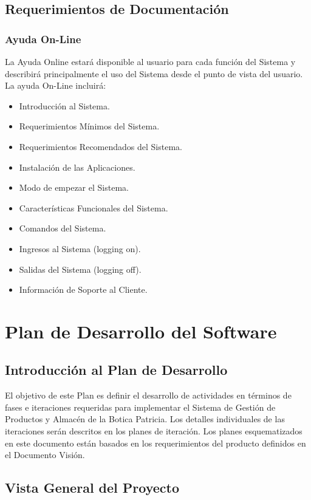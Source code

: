 \documentclass[a4paper,11pt, spanish]{report}
\begin{document}
{{{{{{{{        \subsection{Requerimientos de Documentación}
            \subsubsection {Ayuda On-Line}
                La Ayuda Online estará disponible al usuario para cada función del Sistema y describirá principalmente el uso del Sistema desde el punto de vista del usuario. La ayuda On-Line incluirá:
                \begin{itemize}
                \item Introducción al Sistema.
                \item Requerimientos Mínimos del Sistema.
                \item Requerimientos Recomendados del Sistema.
                \item Instalación de las Aplicaciones.
                \item Modo de empezar el Sistema.
                \item Características Funcionales del Sistema.
                \item Comandos del Sistema.
                \item Ingresos al Sistema (logging on).
                \item Salidas del Sistema (logging off).
                \item Información de Soporte al Cliente.
                \end{itemize}
    \section{Plan de Desarrollo del Software}
    \subsection{Introducción al Plan de Desarrollo}
        El objetivo de este Plan es definir el desarrollo de actividades en términos de fases e iteraciones requeridas para implementar el Sistema de Gestión de Productos y Almacén de la Botica Patricia. Los detalles individuales de las iteraciones serán descritos en los planes de iteración. Los planes esquematizados en este documento están basados en los requerimientos del producto definidos en el Documento Visión.
    \subsection{Vista General del Proyecto}
}}}}}}}}
\end{document}
